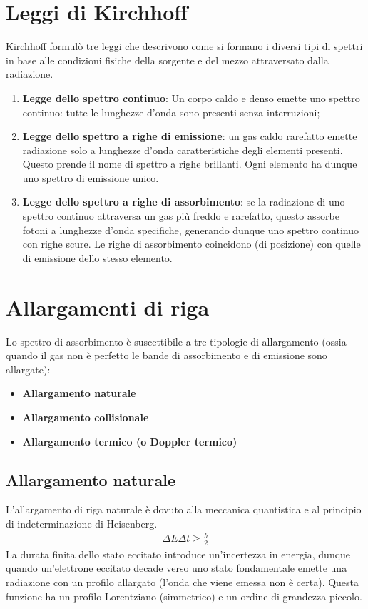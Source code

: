 \documentclass[a4paper, oneside]{book}
\begin{document}
\section{Leggi di Kirchhoff}
Kirchhoff formulò tre leggi che descrivono come si formano i diversi tipi di spettri in base
alle condizioni fisiche della sorgente e del mezzo attraversato dalla radiazione. 
\begin{enumerate}
    \item \textbf{Legge dello spettro continuo}: Un corpo caldo e denso emette uno spettro continuo: tutte le lunghezze
    d'onda sono presenti senza interruzioni;
    \item \textbf{Legge dello spettro a righe di emissione}: un gas caldo rarefatto emette
    radiazione solo a lunghezze d'onda caratteristiche degli elementi presenti. Questo 
    prende il nome di spettro a righe brillanti. Ogni elemento ha dunque uno spettro di emissione 
    unico. 
    \item \textbf{Legge dello spettro a righe di assorbimento}: se la radiazione di uno spettro continuo attraversa 
    un gas più freddo e rarefatto, questo assorbe fotoni a lunghezze d'onda specifiche, generando 
    dunque uno spettro continuo con righe scure. Le righe di assorbimento coincidono (di posizione) con quelle di emissione 
    dello stesso elemento. 
\end{enumerate}

\section{Allargamenti di riga}
Lo spettro di assorbimento è suscettibile a tre tipologie
di allargamento (ossia quando il gas non è perfetto le bande
di assorbimento e di emissione sono allargate):
\begin{itemize}
    \item \textbf{Allargamento naturale}
    \item \textbf{Allargamento collisionale}
    \item \textbf{Allargamento termico (o Doppler termico)}
\end{itemize}

\subsection{Allargamento naturale}
L'allargamento di riga naturale è dovuto alla meccanica quantistica e al principio di indeterminazione 
di Heisenberg. 
\begin{align}
    \Delta E \Delta t \geq \frac{\hbar}{2}
\end{align}
La durata finita dello stato eccitato introduce un'incertezza in energia, 
dunque quando un'elettrone eccitato decade verso uno stato fondamentale emette una radiazione 
con un profilo allargato (l'onda che viene emessa non è certa). Questa funzione 
ha un profilo Lorentziano (simmetrico) e un ordine di grandezza piccolo.
\end{document}
